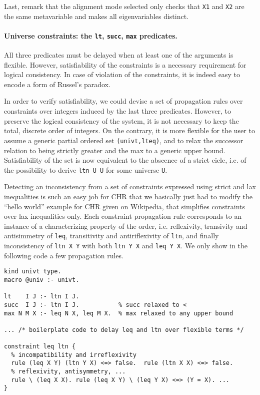 \documentclass{easychair}
\begin{document}
Last, remark that the alignment mode selected only checks
that \verb+X1+ and \verb+X2+ are the same metavariable and
makes all eigenvariables distinct.

\paragraph{Universe constraints: the \texttt{lt}, \texttt{succ}, \texttt{max} predicates.}
All three predicates must be delayed when at least one of the arguments is flexible. However, satisfiability of the constraints is a necessary requirement for logical consistency. In case of violation of the constraints, it is indeed easy to encode a form of Russel's paradox.

In order to verify satisfiability, we could devise a set of propagation rules
over constraints over integers induced by the last three predicates. However, to preserve the logical consistency of the system, it is not necessary to keep the total, discrete order of integers. On the contrary, it is more flexible for the user to assume a generic partial ordered set \verb+(univt,lteq)+, and to relax the successor relation to being strictly greater and the max to a generic upper bound. Satisfiability of the set is now equivalent to the abscence of a strict cicle, i.e. of the possibility to derive \verb+ltn U U+ for some universe \verb+U+.

Detecting an inconsistency from a set of constraints expressed using strict and lax inequalities is such an easy job for CHR that we basically just had to modify the ``hello world'' example for CHR given on Wikipedia, that simplifies constraints over lax inequalities only. Each constraint propagation rule corresponds to an instance of a characterizing property of the order, i.e. reflexivity, transivity and antisimmetry of \verb+leq+, transitivity and antiriflexivity of \verb+ltn+, and finally inconsistency of \verb+ltn X Y+ with both \verb+ltn Y X+ and \verb+leq Y X+. We only show in the following code a few propagation rules.

\begin{Verbatim}
kind univt type.
macro @univ :- univt.

lt    I J :- ltn I J.
succ  I J :- ltn I J.           % succ relaxed to <
max N M X :- leq N X, leq M X.  % max relaxed to any upper bound

... /* boilerplate code to delay leq and ltn over flexible terms */

constraint leq ltn {
  % incompatibility and irreflexivity    
  rule (leq X Y) (ltn Y X) <=> false.  rule (ltn X X) <=> false.
  % reflexivity, antisymmetry, ...
  rule \ (leq X X). rule (leq X Y) \ (leq Y X) <=> (Y = X). ...
}
\end{Verbatim}
\end{document}
